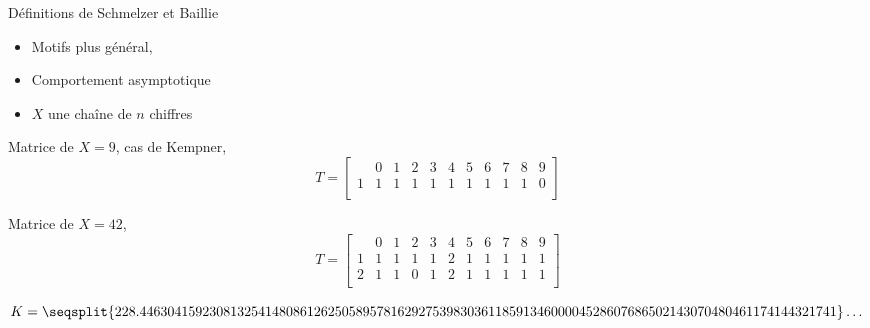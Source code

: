 \documentclass{beamer}
\begin{document}
\begin{frame}{D\'efinitions de Schmelzer et Baillie}
	\begin{itemize}
		\item Motifs plus g\'en\'eral,
		\item Comportement asymptotique
		\item $X$ une cha\^{i}ne de $n$ chiffres
	\end{itemize} 

	Matrice de $X=9$, cas de Kempner,
	\begin{equation*}
			T = 
		\left[
			\begin{array}{c|cccccccccc}
						& 0 & 1 & 2 & 3 & 4 & 5 & 6 & 7 & 8 & 9 \\
				\hline 1& 1 & 1 & 1 & 1 & 1 & 1 & 1 & 1 & 1 & 0 \\
			\end{array}
		\right]
	\end{equation*}

	Matrice de $X=42$,
	\begin{equation*}
			T = 
		\left[
			\begin{array}{c|cccccccccc}
						& 0 & 1 & 2 & 3 & 4 & 5 & 6 & 7 & 8 & 9 \\
				\hline 1& 1 & 1 & 1 & 1 & 2 & 1 & 1 & 1 & 1 & 1 \\
				2		& 1 & 1 & 0 & 1 & 2 & 1 & 1 & 1 & 1 & 1 \\
			\end{array}
		\right]
	\end{equation*}

	$K = \seqsplit{228.44630415923081325414808612625058957816292753983036118591
	34600004528607686502143070480461174144321741} \ldots$

\end{frame}
\end{document}
